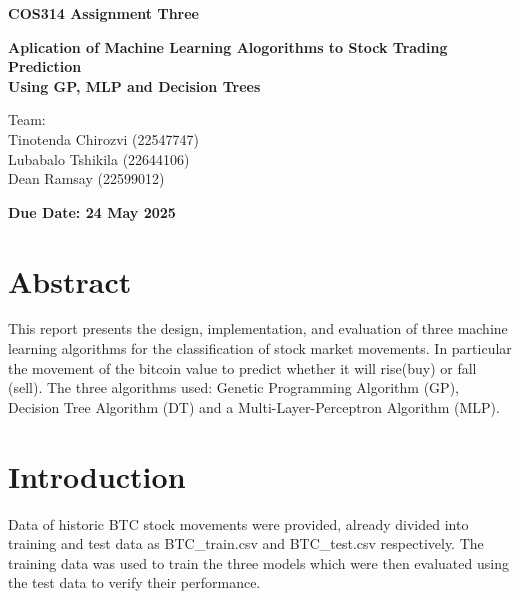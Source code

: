 \documentclass[a4paper,12pt]{article}
\begin{document}

\begin{center}            
    {\LARGE\textbf{COS314 Assignment Three}}\\
    
    \vspace{4cm}
    
    {\Large\textbf{Aplication of Machine Learning Alogorithms to Stock Trading Prediction}}\\
    \vspace{0.5cm}
    {\large\textbf{Using GP, MLP and Decision Trees}}\\
    
    \vspace{12cm}

    {\large Team:}\\
    \vspace{0.3cm}
    {\large Tinotenda Chirozvi (22547747)}\\
    {\large Lubabalo Tshikila (22644106)}\\
    {\large Dean Ramsay (22599012)}\\
    
    \vspace{2cm}
    
    {\large\textbf{Due Date: 24 May 2025}}\\
    
\end{center}

\clearpage
{}

\section*{Abstract}
This report presents the design, implementation, and evaluation of three machine learning algorithms for the classification of stock market movements. In particular the movement of the bitcoin value to predict whether it will rise(buy) or fall (sell). The three algorithms used: Genetic Programming Algorithm (GP), Decision Tree Algorithm (DT) and a Multi-Layer-Perceptron Algorithm (MLP).

\section{Introduction}
Data of historic BTC stock movements were provided, already divided into training and test data as BTC\_train.csv and BTC\_test.csv respectively.
The training data was used to train the three models which were then evaluated using the test data to verify their performance.
\end{document}
